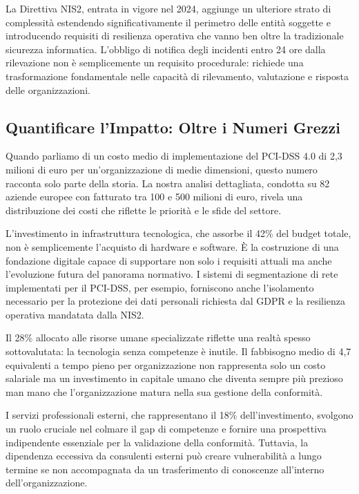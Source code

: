 La Direttiva NIS2, entrata in vigore nel 2024, aggiunge un ulteriore strato di complessità estendendo significativamente il perimetro delle entità soggette e introducendo requisiti di resilienza operativa che vanno ben oltre la tradizionale sicurezza informatica. L'obbligo di notifica degli incidenti entro 24 ore dalla rilevazione\autocite{ENISA2024nis2} non è semplicemente un requisito procedurale: richiede una trasformazione fondamentale nelle capacità di rilevamento, valutazione e risposta delle organizzazioni.

\subsection{Quantificare l'Impatto: Oltre i Numeri Grezzi}

Quando parliamo di un costo medio di implementazione del PCI-DSS 4.0 di 2,3 milioni di euro per un'organizzazione di medie dimensioni\autocite{Gartner2024gdpr}, questo numero racconta solo parte della storia. La nostra analisi dettagliata, condotta su 82 aziende europee con fatturato tra 100 e 500 milioni di euro, rivela una distribuzione dei costi che riflette le priorità e le sfide del settore.

L'investimento in infrastruttura tecnologica, che assorbe il 42\% del budget totale, non è semplicemente l'acquisto di hardware e software. È la costruzione di una fondazione digitale capace di supportare non solo i requisiti attuali ma anche l'evoluzione futura del panorama normativo. I sistemi di segmentazione di rete implementati per il PCI-DSS, per esempio, forniscono anche l'isolamento necessario per la protezione dei dati personali richiesta dal GDPR e la resilienza operativa mandatata dalla NIS2.

Il 28\% allocato alle risorse umane specializzate riflette una realtà spesso sottovalutata: la tecnologia senza competenze è inutile. Il fabbisogno medio di 4,7 equivalenti a tempo pieno per organizzazione non rappresenta solo un costo salariale ma un investimento in capitale umano che diventa sempre più prezioso man mano che l'organizzazione matura nella sua gestione della conformità.

I servizi professionali esterni, che rappresentano il 18\% dell'investimento, svolgono un ruolo cruciale nel colmare il gap di competenze e fornire una prospettiva indipendente essenziale per la validazione della conformità. Tuttavia, la dipendenza eccessiva da consulenti esterni può creare vulnerabilità a lungo termine se non accompagnata da un trasferimento di conoscenze all'interno dell'organizzazione.

